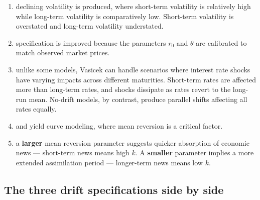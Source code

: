 \begin{mrkeybox}[title={Vasicek model effectiveness}]
\begin{enumerate}[label=\textbf{\alph*)}]
\item {} declining volatility is produced, where short-term
      volatility is relatively high while long-term volatility is comparatively low. Short-term
      volatility is overstated and long-term volatility understated.
\item {} specification is improved because the parameters
      $r_0$ and $\theta$ are calibrated to match observed market prices.
\item {} unlike some models, Vasicek can handle scenarios where interest
      rate shocks have varying impacts across different maturities. Short-term rates are affected
      more than long-term rates, and shocks dissipate as rates revert to the long-run mean.
      No-drift models, by contrast, produce parallel shifts affecting all rates equally.
\item {} and yield curve modeling, where mean
      reversion is a critical factor.
\item {} a \textbf{larger} mean reversion parameter suggests
      quicker absorption of economic news --- short-term news means high $k$. A \textbf{smaller}
      parameter implies a more extended assimilation period --- longer-term news means low $k$.
\end{enumerate}
\end{mrkeybox}

\subsection{The three drift specifications side by side}

